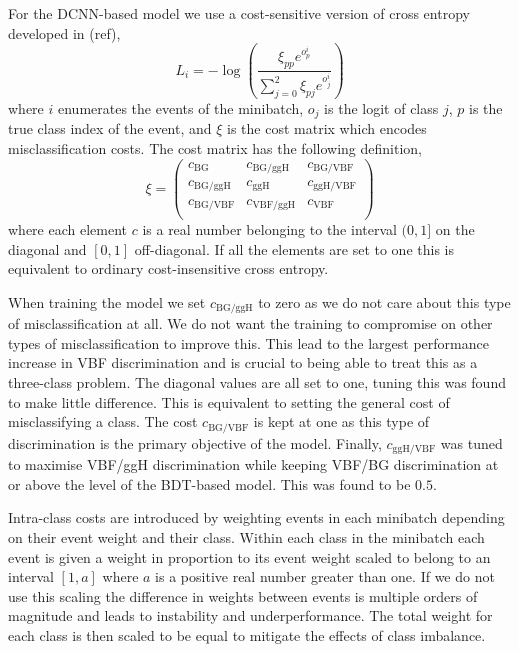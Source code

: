 For the DCNN-based model we use a cost-sensitive version of cross entropy developed in (ref),
\begin{equation}
    L_i = -\log\left(\frac{\xi_{pp}e^{o^{i}_{p}}}{\sum_{j=0}^{2}\xi_{pj}e^{o^{i}_{j}}}\right)
\end{equation} 
where $i$ enumerates the events of the minibatch, $o_j$ is the logit of class $j$, $p$ is the true class index of the event, and $\xi$ is the cost matrix which encodes misclassification costs.
The cost matrix has the following definition,
\begin{equation}
    \xi = \begin{pmatrix}
        c_{\mathrm{BG}} & c_{\mathrm{BG}/\mathrm{ggH}} & c_{\mathrm{BG}/\mathrm{VBF}} \\
        c_{\mathrm{BG}/\mathrm{ggH}} & c_{\mathrm{ggH}} & c_{\mathrm{ggH}/\mathrm{VBF}} \\
        c_{\mathrm{BG}/\mathrm{VBF}} & c_{\mathrm{VBF}/\mathrm{ggH}} & c_{\mathrm{VBF}} \\
    \end{pmatrix}
\end{equation}
where each element $c$ is a real number belonging to the interval $(0,1]$ on the diagonal and $[0,1]$ off-diagonal. If all the elements are set to one this is equivalent to ordinary cost-insensitive cross entropy. 

When training the model we set $c_{\mathrm{BG}/\mathrm{ggH}}$ to zero as we do not care about this type of misclassification at all. We do not want the training to compromise on other types of misclassification to improve this. This lead to the largest performance increase in VBF discrimination and is crucial to being able to treat this as a three-class problem.
 The diagonal values are all set to one, tuning this was found to make little difference. This is equivalent to setting the general cost of misclassifying a class.
The cost $c_{\mathrm{BG}/\mathrm{VBF}}$ is kept at one as this type of discrimination is the primary objective of the model. 
Finally, $c_{\mathrm{ggH}/\mathrm{VBF}}$ was tuned to maximise VBF/ggH discrimination while keeping VBF/BG discrimination at or above the level of the BDT-based model. This was found to be $0.5$.

Intra-class costs are introduced by weighting events in each minibatch depending on their event weight and their class.  
Within each class in the minibatch each event is given a weight in proportion to its event weight scaled to belong to an interval $[1,a]$ where $a$ is a positive real number greater than one. 
If we do not use this scaling the difference in weights between events is multiple orders of magnitude and leads to instability and underperformance. 
The total weight for each class is then scaled to be equal to mitigate the effects of class imbalance. 

